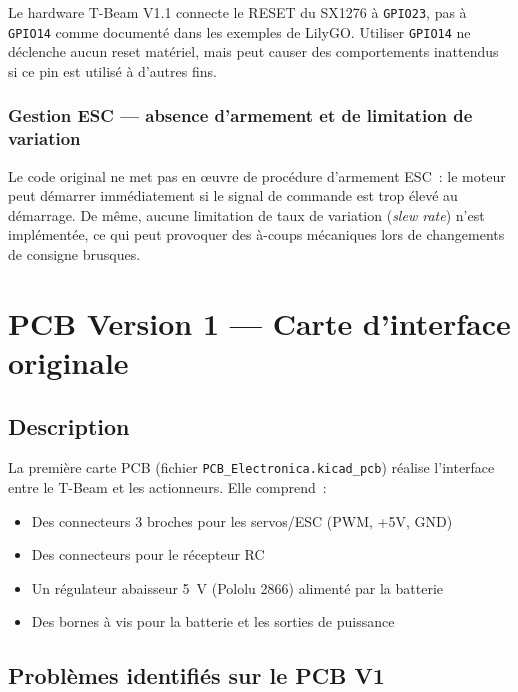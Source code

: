 \documentclass[12pt,a4paper]{article}
\newcommand{\gpio}[1]{\texttt{GPIO#1}}
\newcommand{\file}[1]{\texttt{#1}}
\begin{document}
Le hardware T-Beam V1.1 connecte le RESET du SX1276 à \gpio{23}, pas à
\gpio{14} comme documenté dans les exemples de LilyGO. Utiliser \gpio{14}
ne déclenche aucun reset matériel, mais peut causer des comportements
inattendus si ce pin est utilisé à d'autres fins.

\subsubsection{Gestion ESC — absence d'armement et de limitation de variation}

Le code original ne met pas en œuvre de procédure d'armement ESC~: le moteur
peut démarrer immédiatement si le signal de commande est trop élevé au
démarrage. De même, aucune limitation de taux de variation (\emph{slew rate})
n'est implémentée, ce qui peut provoquer des à-coups mécaniques lors de
changements de consigne brusques.

\section{PCB Version 1 — Carte d'interface originale}

\subsection{Description}

La première carte PCB (fichier \file{PCB\_Electronica.kicad\_pcb}) réalise
l'interface entre le T-Beam et les actionneurs. Elle comprend~:

\begin{itemize}
  \item Des connecteurs 3 broches pour les servos/ESC (PWM, +5V, GND)
  \item Des connecteurs pour le récepteur RC
  \item Un régulateur abaisseur 5~V (Pololu 2866) alimenté par la batterie
  \item Des bornes à vis pour la batterie et les sorties de puissance
\end{itemize}

\subsection{Problèmes identifiés sur le PCB V1}
\end{document}
